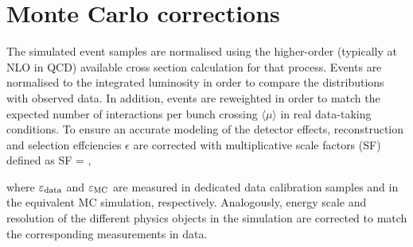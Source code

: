 \section{Monte Carlo corrections}
\label{chp:evtsim:mccorr}


The simulated event samples are normalised using the higher-order (typically at NLO in QCD) available cross section calculation for that process. Events are normalised to the integrated luminosity in order to compare the distributions with observed data. In addition, events are reweighted in order to match the expected number of interactions per bunch crossing $\langle\mu\rangle$ in real data-taking conditions.
To ensure an accurate modeling of the detector effects, reconstruction and selection effciencies $\epsilon$ are corrected with multiplicative scale factors (SF) defined as
\be
{\rm SF} = ,
\ee

\noindent where $\epsilon_{\rm data}$ and $\epsilon_{\rm MC}$ are measured in dedicated data calibration samples and in the equivalent MC simulation, respectively. Analogously, energy scale and resolution of the different physics objects in the simulation are corrected to match the corresponding measurements in data.

